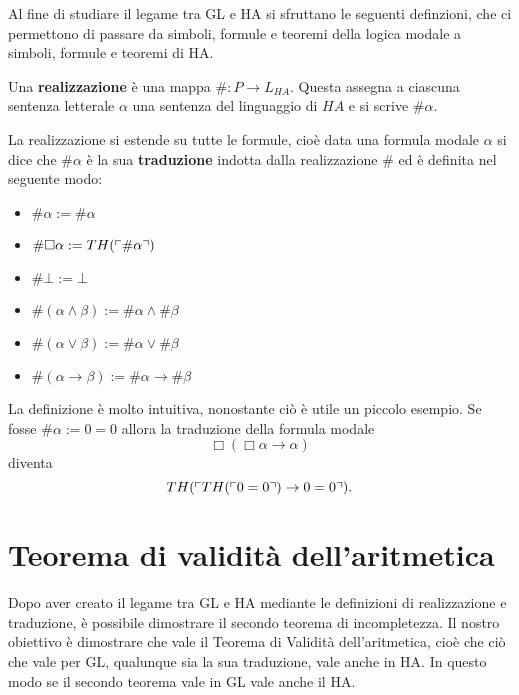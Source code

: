 Al fine di studiare il legame tra GL e HA si sfruttano le seguenti definzioni, che ci permettono di 
passare da simboli, formule e teoremi della logica modale a simboli, formule e teoremi di HA.

\begin{defi}
Una \textbf{realizzazione} \`e una mappa $\#: P \rightarrow L_{HA}$.
Questa assegna a ciascuna sentenza letterale $\alpha$ una sentenza del linguaggio di $HA$ e si scrive $\# \alpha$.
\end{defi}

\begin{defi}
La realizzazione si estende su tutte le formule, cio\`e data una formula modale $\alpha$ si dice che $\#\alpha$ \`e la sua \textbf{traduzione}
indotta dalla realizzazione $\#$ ed \`e definita nel
seguente modo:
\begin{itemize}
\item $\#\alpha := \#\alpha$
\item $\#\Box\alpha := TH(\ulcorner{\#\alpha}\urcorner) $
\item $\#\bot := \bot$
\item $\#(\alpha \wedge \beta) := \#\alpha \wedge \#\beta$
\item $\#(\alpha \vee \beta) := \#\alpha \vee \#\beta$
\item $\#(\alpha \rightarrow \beta) := \#\alpha \rightarrow \#\beta$
\end{itemize}
\end{defi}

\begin{esempio}
La definizione \`e molto intuitiva, nonostante ciò \`e utile un piccolo esempio.
Se fosse $\#\alpha:= 0=0$ allora la traduzione della formula modale
 $$\Box(\Box\alpha\rightarrow\alpha)$$ 
diventa 
$$TH(\ulcorner{TH(\ulcorner{0=0}\urcorner)\rightarrow 0=0}\urcorner).$$
\end{esempio}

\section{Teorema di validità dell'aritmetica}

Dopo aver creato il legame tra GL e HA mediante le definizioni di
realizzazione e traduzione, \`e possibile dimostrare 
il secondo teorema di incompletezza. 
Il nostro obiettivo \`e dimostrare che vale il Teorema di Validità dell'aritmetica, cio\`e che
ciò che vale per GL, qualunque sia la sua traduzione, vale anche in HA.
In questo modo se il secondo teorema vale in GL vale anche il HA.

